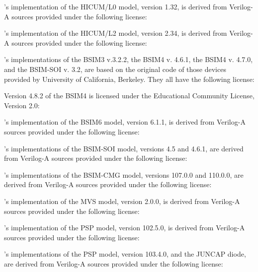 \Xyce{}'s implementation of the HICUM/L0 model, version 1.32, is derived from
Verilog-A sources provided under the following license:


\Xyce{}'s implementation of the HICUM/L2 model, version 2.34, is derived from
Verilog-A sources provided under the following license:


\Xyce{}'s implementations of the BSIM3 v.3.2.2, the BSIM4 v. 4.6.1,
the BSIM4 v. 4.7.0, and the BSIM-SOI v. 3.2, are based on the original code of
those devices provided by University of California, Berkeley.  They all have
the following license:


Version 4.8.2 of the BSIM4 is licensed under the Educational Community License, Version 2.0:


\Xyce{}'s implementation of the BSIM6 model, version 6.1.1, is derived from
Verilog-A sources provided under the following license:


\Xyce{}'s implementations of the BSIM-SOI model, versions 4.5 and 4.6.1, are
derived from Verilog-A sources provided under the following license:


\Xyce{}'s implementations of the BSIM-CMG model, versions 107.0.0 and 110.0.0,
are derived from Verilog-A sources provided under the following license:


\Xyce{}'s implementation of the MVS model, version 2.0.0, is derived from
Verilog-A sources provided under the following license:


\Xyce{}'s implementation of the PSP model, version 102.5.0, is derived from
Verilog-A sources provided under the following license:


\Xyce{}'s implementations of the PSP model, version 103.4.0, and the JUNCAP
diode, are derived from Verilog-A sources provided under the following license:


